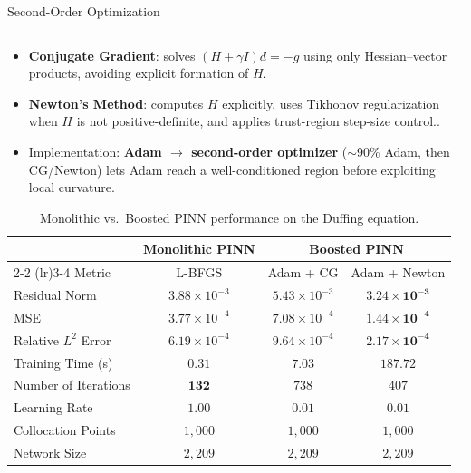 \documentclass[final]{beamer}
\newlength{\colwidth}
\newcommand{\blockrule}{\vspace{-1.5em}\textcolor{harvardcrimson}{\rule{\linewidth}{1.2pt}}\vspace{-0.2em}}
\begin{document}
\begin{frame}[t]
\begin{columns}[t]
\begin{column}{\colwidth}
  

  \begin{block}{Second-Order Optimization}
    \blockrule
    
    \begin{itemize}
      \item \textbf{Conjugate Gradient}: solves $(H+\gamma I)d = -g$ using only Hessian--vector products, avoiding explicit formation of $H$.
      \item \textbf{Newton's Method}: computes $H$ explicitly, uses Tikhonov regularization when $H$ is not positive-definite, and applies trust-region step-size control..
      \item Implementation: \textbf{Adam $\to$ second-order optimizer} ($\sim$90\% Adam, then CG/Newton) lets Adam reach a well-conditioned region before exploiting local curvature.
    \end{itemize}

    \begin{table}[ht]
    \centering
    \begin{tabular}{lccc}
        \toprule
        & \textbf{Monolithic PINN} & \multicolumn{2}{c}{\textbf{Boosted PINN}} \\
        \cmidrule(lr){2-2} \cmidrule(lr){3-4}
        Metric & L-BFGS & Adam + CG & Adam + Newton \\
        \midrule
        Residual Norm         & $3.88 \times 10^{-3}$ & $5.43 \times 10^{-3}$ & $\bm{3.24 \times 10^{-3}}$ \\
        MSE                   & $3.77 \times 10^{-4}$ & $7.08 \times 10^{-4}$ & $\bm{1.44 \times 10^{-4}}$ \\
        Relative $L^2$ Error  & $6.19 \times 10^{-4}$ & $9.64 \times 10^{-4}$ & $\bm{2.17 \times 10^{-4}}$ \\
        Training Time (s)     & $\bm{0.31}$           & $7.03$                & $187.72$              \\
        Number of Iterations  & $\bm{132}$            & $738$                 & $407$                 \\
        Learning Rate         & $1.00$                & $0.01$                & $0.01$                \\
        Collocation Points    & $1{,}000$             & $1{,}000$             & $1{,}000$             \\
        Network Size          & $2{,}209$             & $2{,}209$             & $2{,}209$             \\
        \bottomrule
    \end{tabular}
    \caption{Monolithic vs.\ Boosted PINN performance on the Duffing equation.}
    \label{tab:duffing_comparison}
    \end{table}


\end{block}
\end{column}
\end{columns}
\end{frame}
\end{document}
